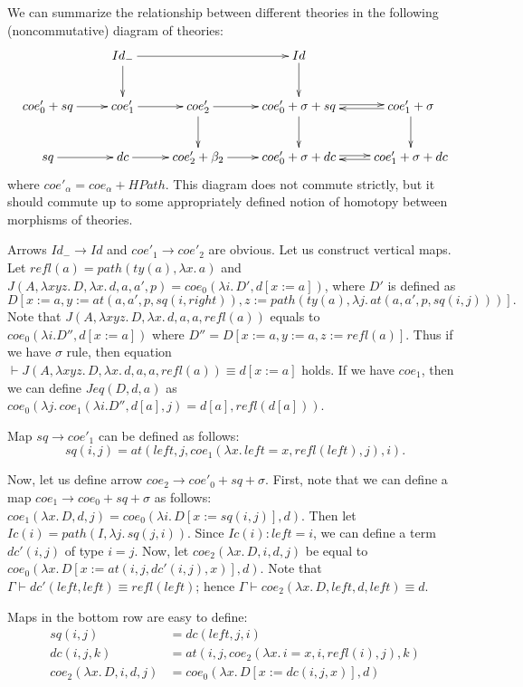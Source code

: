 \documentclass[reqno]{amsart}
\theoremstyle{definition}
\theoremstyle{remark}
\newcommand{\deq}{\equiv}
\newcommand{\repl}{:=}
\numberwithin{figure}{section}
\begin{document}
We can summarize the relationship between different theories in the following (noncommutative) diagram of theories:
\[ \xymatrix{ & Id_- \ar[rr] \ar[d] & & Id \ar[d] \\
              coe'_0 + sq \ar[r] & coe'_1 \ar[r] & coe'_2 \ar[d]    \ar[r] & coe'_0 + \sigma + sq \ar@<1.5pt>[r] \ar[d] & coe'_1 + \sigma \ar[d] \ar@<1.5pt>[l] \\
              sq          \ar[r] & dc     \ar[r] & coe'_2 + \beta_2 \ar[r] & coe'_0 + \sigma + dc \ar@<1.5pt>[r]        & coe'_1 + \sigma + dc   \ar@<1.5pt>[l]
            } \]
where $coe'_\alpha = coe_\alpha + HPath$.
This diagram does not commute strictly, but it should commute up to some appropriately defined notion of homotopy between morphisms of theories.

Arrows $Id_- \to Id$ and $coe'_1 \to coe'_2$ are obvious.
Let us construct vertical maps.
Let $refl(a) = path(ty(a), \lambda x.\,a)$ and $J(A, \lambda x y z.\,D, \lambda x.\,d, a, a', p) = coe_0(\lambda i.\,D', d[x \repl a])$, where $D'$ is defined as
\[ D[x \repl a, y \repl at(a, a', p, sq(i,right)), z \repl path(ty(a), \lambda j.\,at(a, a', p, sq(i,j)))]. \]
Note that $J(A, \lambda x y z.\,D, \lambda x.\,d, a, a, refl(a))$ equals to $coe_0(\lambda i. D'', d[x \repl a])$ where $D'' = D[x \repl a, y \repl a, z \repl refl(a)]$.
Thus if we have $\sigma$ rule, then equation $\vdash J(A, \lambda x y z.\,D, \lambda x.\,d, a, a, refl(a)) \deq d[x \repl a]$ holds.
If we have $coe_1$, then we can define $Jeq(D,d,a)$ as $coe_0(\lambda j.\,coe_1(\lambda i. D'', d[a], j) = d[a], refl(d[a]))$.

Map $sq \to coe'_1$ can be defined as follows:
\[ sq(i,j) = at(left, j, coe_1(\lambda x.\,left = x, refl(left), j), i). \]

Now, let us define arrow $coe_2 \to coe'_0 + sq + \sigma$.
First, note that we can define a map $coe_1 \to coe_0 + sq + \sigma$ as follows: $coe_1(\lambda x.\,D, d, j) = coe_0(\lambda i.\,D[x \repl sq(i,j)], d)$.
Then let $Ic(i) = path(I, \lambda j.\,sq(j,i))$.
Since $Ic(i) : left = i$, we can define a term $dc'(i,j)$ of type $i = j$.
Now, let $coe_2(\lambda x.\,D, i, d, j)$ be equal to $coe_0(\lambda x.\,D[x \repl at(i, j, dc'(i,j), x)], d)$.
Note that $\Gamma \vdash dc'(left,left) \deq refl(left)$; hence $\Gamma \vdash coe_2(\lambda x.\,D, left, d, left) \deq d$.

Maps in the bottom row are easy to define:
\begin{align*}
sq(i,j) & = dc(left,j,i) \\
dc(i,j,k) & = at(i,j,coe_2(\lambda x.\,i = x, i, refl(i), j),k) \\
coe_2(\lambda x.\,D, i, d, j) & = coe_0(\lambda x.\,D[x \repl dc(i,j,x)], d)
\end{align*}
\end{document}
